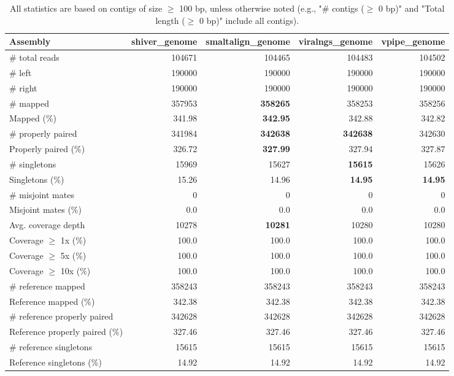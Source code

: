 \documentclass[12pt,a4paper]{article}
\begin{document}
\begin{table}[ht]
\begin{center}
\caption{All statistics are based on contigs of size $\geq$ 100 bp, unless otherwise noted (e.g., "\# contigs ($\geq$ 0 bp)" and "Total length ($\geq$ 0 bp)" include all contigs).}
\begin{tabular}{|l*{4}{|r}|}
\hline
Assembly & shiver\_genome & smaltalign\_genome & viralngs\_genome & vpipe\_genome \\ \hline
\# total reads & 104671 & 104465 & 104483 & 104502 \\ \hline
\# left & 190000 & 190000 & 190000 & 190000 \\ \hline
\# right & 190000 & 190000 & 190000 & 190000 \\ \hline
\# mapped & 357953 & {\bf 358265} & 358253 & 358256 \\ \hline
Mapped (\%) & 341.98 & {\bf 342.95} & 342.88 & 342.82 \\ \hline
\# properly paired & 341984 & {\bf 342638} & {\bf 342638} & 342630 \\ \hline
Properly paired (\%) & 326.72 & {\bf 327.99} & 327.94 & 327.87 \\ \hline
\# singletons & 15969 & 15627 & {\bf 15615} & 15626 \\ \hline
Singletons (\%) & 15.26 & 14.96 & {\bf 14.95} & {\bf 14.95} \\ \hline
\# misjoint mates & 0 & 0 & 0 & 0 \\ \hline
Misjoint mates (\%) & 0.0 & 0.0 & 0.0 & 0.0 \\ \hline
Avg. coverage depth & 10278 & {\bf 10281} & 10280 & 10280 \\ \hline
Coverage $\geq$ 1x (\%) & 100.0 & 100.0 & 100.0 & 100.0 \\ \hline
Coverage $\geq$ 5x (\%) & 100.0 & 100.0 & 100.0 & 100.0 \\ \hline
Coverage $\geq$ 10x (\%) & 100.0 & 100.0 & 100.0 & 100.0 \\ \hline
\# reference mapped & 358243 & 358243 & 358243 & 358243 \\ \hline
Reference mapped (\%) & 342.38 & 342.38 & 342.38 & 342.38 \\ \hline
\# reference properly paired & 342628 & 342628 & 342628 & 342628 \\ \hline
Reference properly paired (\%) & 327.46 & 327.46 & 327.46 & 327.46 \\ \hline
\# reference singletons & 15615 & 15615 & 15615 & 15615 \\ \hline
Reference singletons (\%) & 14.92 & 14.92 & 14.92 & 14.92 \\ \hline

\end{tabular}
\end{center}
\end{table}
\end{document}
